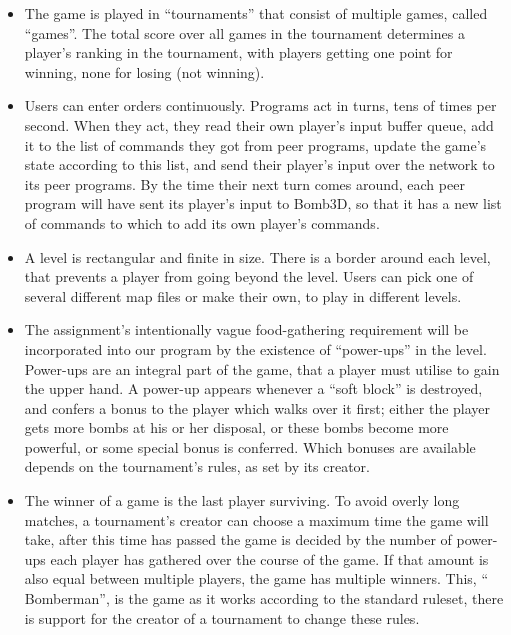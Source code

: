     \begin{itemize}

        \item The game is played in ``tournaments'' that consist of multiple games, called ``games''. The total score over all games in the tournament determines a player's ranking in the tournament, with players getting one point for winning, none for losing (not winning).

    	\item Users can enter orders continuously. Programs act in turns, tens of times per second. When they act, they read their own player's input buffer queue, add it to the list of commands they got from peer programs, update the game's state according to this list, and send their player's input over the network to its peer programs. By the time their next turn comes around, each peer program will have sent its player's input to Bomb3D, so that it has a new list of commands to which to add its own player's commands.

        \item A level is rectangular and finite in size. There is a border around each level, that prevents a player from going beyond the level. Users can pick one of several different map files or make their own, to play in different levels.

        \item The assignment's intentionally vague food-gathering requirement will be incorporated into our program by the existence of ``power-ups'' in the level. Power-ups are an integral part of the game, that a player must utilise to gain the upper hand. A power-up appears whenever a ``soft block'' is destroyed, and confers a bonus to the player which walks over it first; either the player gets more bombs at his or her disposal, or these bombs become more powerful, or some special bonus is conferred. Which bonuses are available depends on the tournament's rules, as set by its creator.

        \item The winner of a game is the last player surviving. To avoid overly long matches, a tournament's creator can choose a maximum time the game will take, after this time has passed the game is decided by the number of power-ups each player has gathered over the course of the game. If that amount is also equal between multiple players, the game has multiple winners. This, `` Bomberman'', is the game as it works according to the standard ruleset, there is support for the creator of a tournament to change these rules.


\end{itemize}
